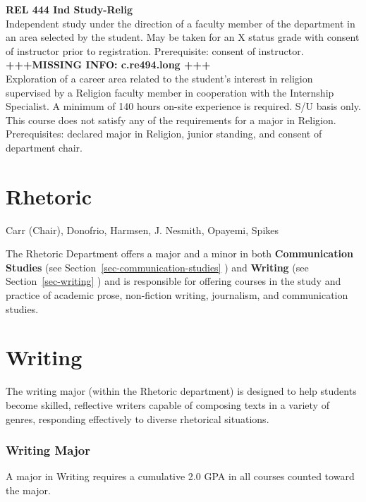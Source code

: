 \documentclass[
  letterpaper,
]{scrbook}
\begin{document}
\textbf{REL 444 Ind Study-Relig}\\
Independent study under the direction of a faculty member of the
department in an area selected by the student. May be taken for an X
status grade with consent of instructor prior to registration.
Prerequisite: consent of instructor.\\
\textbf{+++MISSING INFO: c.re494.long +++}\\
Exploration of a career area related to the student's interest in
religion supervised by a Religion faculty member in cooperation with the
Internship Specialist. A minimum of 140 hours on-site experience is
required. S/U basis only. This course does not satisfy any of the
requirements for a major in Religion. Prerequisites: declared major in
Religion, junior standing, and consent of department chair.

\section{Rhetoric}\label{sec-rhetoric}

Carr (Chair), Donofrio, Harmsen, J. Nesmith, Opayemi, Spikes

The Rhetoric Department offers a major and a minor in both
\textbf{Communication Studies} (see
Section~\ref{sec-communication-studies} ) and \textbf{Writing} (see
Section~\ref{sec-writing} ) and is responsible for offering courses in
the study and practice of academic prose, non-fiction writing,
journalism, and communication studies.

\section{Writing}\label{writing}

The writing major (within the Rhetoric department) is designed to help
students become skilled, reflective writers capable of composing texts
in a variety of genres, responding effectively to diverse rhetorical
situations.

\subsubsection{Writing Major}\label{writing-major}

A major in Writing requires a cumulative 2.0 GPA in all courses counted
toward the major.
\end{document}
